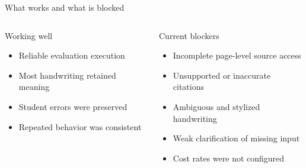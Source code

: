 \documentclass[aspectratio=169,10pt]{beamer}
\begin{document}
\begin{frame}{What works and what is blocked}
\begin{columns}[T,onlytextwidth]
\begin{block}{Working well}
\begin{itemize}
\item Reliable evaluation execution
\item Most handwriting retained meaning
\item Student errors were preserved
\item Repeated behavior was consistent
\end{itemize}
\end{block}
\begin{block}{Current blockers}
\begin{itemize}
\item Incomplete page-level source access
\item Unsupported or inaccurate citations
\item Ambiguous and stylized handwriting
\item Weak clarification of missing input
\item Cost rates were not configured
\end{itemize}
\end{block}
\end{columns}
\end{frame}
\end{document}
